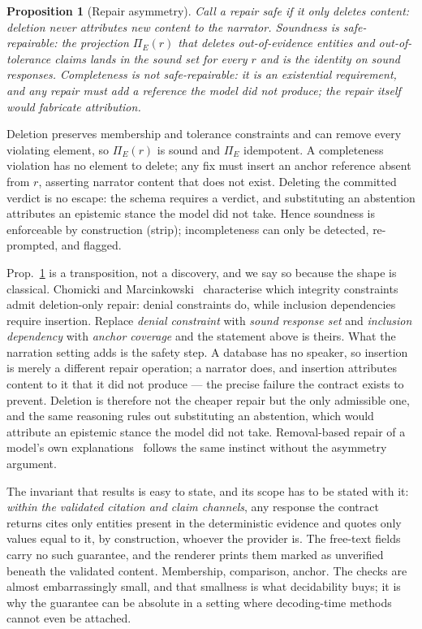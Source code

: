 \documentclass[conference]{IEEEtran}
\newtheorem{proposition}{Proposition}
\begin{document}
\begin{proposition}[Repair asymmetry]
\label{prop:asym}
Call a repair \emph{safe} if it only deletes content: deletion never attributes new content to the narrator. Soundness is safe-repairable: the projection $\Pi_E(r)$ that deletes out-of-evidence entities and out-of-tolerance claims lands in the sound set for every $r$ and is the identity on sound responses. Completeness is not safe-repairable: it is an existential requirement, and any repair must add a reference the model did not produce; the repair itself would fabricate attribution.
\end{proposition}
\begin{IEEEproof}
Deletion preserves membership and tolerance constraints and can remove every violating element, so $\Pi_E(r)$ is sound and $\Pi_E$ idempotent. A completeness violation has no element to delete; any fix must insert an anchor reference absent from $r$, asserting narrator content that does not exist. Deleting the committed verdict is no escape: the schema requires a verdict, and substituting an abstention attributes an epistemic stance the model did not take. Hence soundness is enforceable by construction (strip); incompleteness can only be detected, re-prompted, and flagged.
\end{IEEEproof}

Prop.~\ref{prop:asym} is a transposition, not a discovery, and we say so because the shape is classical. Chomicki and Marcinkowski~\cite{chomicki2005minimal} characterise which integrity constraints admit deletion-only repair: denial constraints do, while inclusion dependencies require insertion. Replace \emph{denial constraint} with \emph{sound response set} and \emph{inclusion dependency} with \emph{anchor coverage} and the statement above is theirs. What the narration setting adds is the safety step. A database has no speaker, so insertion is merely a different repair operation; a narrator does, and insertion attributes content to it that it did not produce --- the precise failure the contract exists to prevent. Deletion is therefore not the cheaper repair but the only admissible one, and the same reasoning rules out substituting an abstention, which would attribute an epistemic stance the model did not take. Removal-based repair of a model's own explanations~\cite{luo2026removal} follows the same instinct without the asymmetry argument.

The invariant that results is easy to state, and its scope has to be stated with it: \emph{within the validated citation and claim channels}, any response the contract returns cites only entities present in the deterministic evidence and quotes only values equal to it, by construction, whoever the provider is. The free-text fields carry no such guarantee, and the renderer prints them marked as unverified beneath the validated content. Membership, comparison, anchor. The checks are almost embarrassingly small, and that smallness is what decidability buys; it is why the guarantee can be absolute in a setting where decoding-time methods~\cite{outlines,gcd} cannot even be attached.
\end{document}

